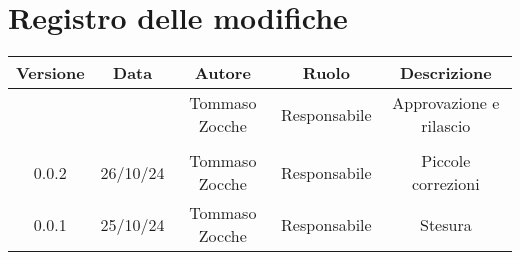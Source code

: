 
\section*{Registro delle modifiche}
\begin{table}[H]
    \begin{tabular}{|c|c|c|c|c|}
        \hline
         \textbf{Versione} &  \textbf{Data} &  \textbf{Autore} &  \textbf{Ruolo} & \textbf{Descrizione} \\
          \hline
          &  & Tommaso Zocche & Responsabile & Approvazione e rilascio\\
          \hline
          &  &  &  &  \\
          \hline
          0.0.2 & 26/10/24 & Tommaso Zocche & Responsabile & Piccole correzioni \\
          \hline
          0.0.1 & 25/10/24 & Tommaso Zocche & Responsabile & Stesura \\
          \hline
    \end{tabular}
\end{table}